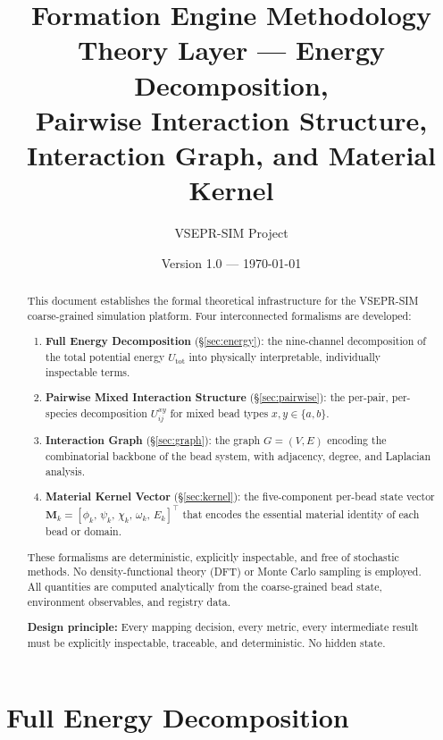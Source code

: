 \documentclass[11pt, a4paper, oneside]{article}
\title{\textbf{Formation Engine Methodology} \\[0.5em]
\Large Theory Layer — Energy Decomposition, \\
Pairwise Interaction Structure, \\
Interaction Graph, and Material Kernel}
\author{VSEPR-SIM Project}
\date{Version 1.0 — \today}
\begin{document}
\maketitle
\thispagestyle{fancy}

\begin{abstract}
This document establishes the formal theoretical infrastructure for the
VSEPR-SIM coarse-grained simulation platform.  Four interconnected
formalisms are developed:
\begin{enumerate}
  \item \textbf{Full Energy Decomposition} (§\ref{sec:energy}):
        the nine-channel decomposition of the total potential energy
        $U_{\mathrm{tot}}$ into physically interpretable, individually
        inspectable terms.
  \item \textbf{Pairwise Mixed Interaction Structure} (§\ref{sec:pairwise}):
        the per-pair, per-species decomposition
        $U_{ij}^{xy}$ for mixed bead types $x, y \in \{a, b\}$.
  \item \textbf{Interaction Graph} (§\ref{sec:graph}):
        the graph $G = (V, E)$ encoding the combinatorial backbone of
        the bead system, with adjacency, degree, and Laplacian analysis.
  \item \textbf{Material Kernel Vector} (§\ref{sec:kernel}):
        the five-component per-bead state vector
        $\mathbf{M}_k = [\phi_k,\, \psi_k,\, \chi_k,\, \omega_k,\, E_k]^\top$
        that encodes the essential material identity of each bead or domain.
\end{enumerate}
These formalisms are deterministic, explicitly inspectable, and free of
stochastic methods.  No density-functional theory (DFT) or Monte Carlo
sampling is employed.  All quantities are computed analytically from the
coarse-grained bead state, environment observables, and registry data.

\medskip
\noindent\textbf{Design principle:}
Every mapping decision, every metric, every intermediate result must be
explicitly inspectable, traceable, and deterministic.  No hidden state.
\end{abstract}

\tableofcontents
\newpage

\section{Full Energy Decomposition}
\label{sec:energy}
\end{document}
